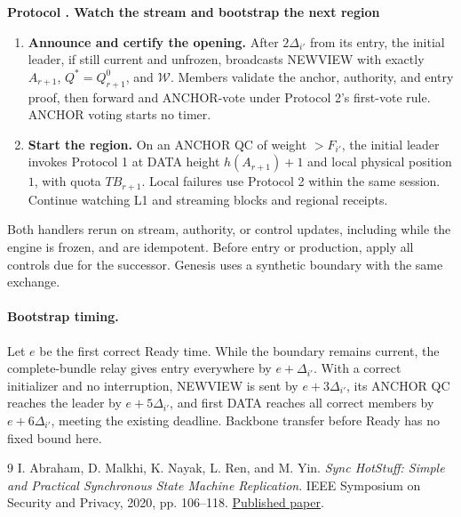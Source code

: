 \documentclass[11pt,a4paper]{article}
\newcounter{protocol}
\newenvironment{protocol}[2]{\refstepcounter{protocol}\label{#1}
\begin{mdframed}[nobreak=true,linewidth=.6pt,skipabove=8pt,skipbelow=8pt,
innertopmargin=7pt,innerbottommargin=7pt]\small
\textbf{Protocol \theprotocol. #2}\par\smallskip}{\end{mdframed}}
\begin{document}
\begin{protocol}{alg:bootstrap}{Watch the stream and bootstrap the next region}
\begin{enumerate}[label=\textbf{\arabic*)},itemsep=5pt]
\item \textbf{Announce and certify the opening.} After $2\Delta_{i'}$
from its entry, the initial leader, if still current and unfrozen,
broadcasts NEWVIEW with exactly $A_{r+1}$, $Q^*=Q_{r+1}^0$, and
$\mathcal W$. Members validate the anchor, authority, and entry proof,
then forward and ANCHOR-vote under Protocol 2's first-vote rule.
ANCHOR voting starts no timer.

\item \textbf{Start the region.} On an ANCHOR QC of weight $>F_{i'}$,
the initial leader invokes Protocol 1 at DATA height $h(A_{r+1})+1$
and local physical position $1$, with quota $TB_{r+1}$.
Local failures use Protocol 2 within the same session.
Continue watching L1 and streaming blocks and regional receipts.
\end{enumerate}
\end{protocol}

Both handlers rerun on stream, authority, or control updates, including
while the engine is frozen, and are idempotent. Before entry or production,
apply all controls due for the successor. Genesis uses a synthetic
boundary with the same exchange.

\paragraph{Bootstrap timing.}
Let $e$ be the first correct Ready time. While the boundary remains current,
the complete-bundle relay gives entry everywhere by $e+\Delta_{i'}$.
With a correct initializer and no interruption, NEWVIEW is sent by
$e+3\Delta_{i'}$, its ANCHOR QC reaches the leader by $e+5\Delta_{i'}$,
and first DATA reaches all correct members by $e+6\Delta_{i'}$, meeting
the existing deadline. Backbone transfer before Ready has no fixed bound here.

\begingroup\small
\begin{thebibliography}{9}
I. Abraham, D. Malkhi, K. Nayak, L. Ren, and M. Yin.
\emph{Sync HotStuff: Simple and Practical Synchronous State Machine Replication}.
IEEE Symposium on Security and Privacy, 2020, pp. 106--118.
\href{https://conferences.computer.org/sp/pdfs/sp/2020/349700a106.pdf}{Published paper}.
\end{thebibliography}
\endgroup
\end{document}

